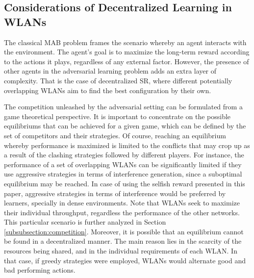 \documentclass[preprint,12pt]{elsarticle}
\begin{document}
\subsection{Considerations of Decentralized Learning in WLANs}
\label{subsection:considerations}
The classical MAB problem frames the scenario whereby an agent interacts with the environment. The agent's goal is to maximize the long-term reward according to the actions it plays, regardless of any external factor. However, the presence of other agents in the adversarial learning problem adds an extra layer of complexity. That is the case of decentralized SR, where different potentially overlapping WLANs aim to find the best configuration by their own. 

The competition unleashed by the adversarial setting can be formulated from a game theoretical perspective. It is important to concentrate on the possible equilibriums that can be achieved for a given game, which can be defined by the set of competitors and their strategies. Of course, reaching an equilibrium whereby performance is maximized is limited to the conflicts that may crop up as a result of the clashing strategies followed by different players. For instance, the performance of a set of overlapping WLANs can be significantly limited if they use aggressive strategies in terms of interference generation, since a suboptimal equilibrium may be reached. In case of using the selfish reward presented in this paper, aggressive strategies in terms of interference would be preferred by learners, specially in dense environments. Note that WLANs seek to maximize their individual throughput, regardless the performance of the other networks. This particular scenario is further analyzed in Section \ref{subsubsection:competition}. Moreover, it is possible that an equilibrium cannot be found in a decentralized manner. The main reason lies in the scarcity of the resources being shared, and in the individual requirements of each WLAN. In that case, if greedy strategies were employed, WLANs would alternate good and bad performing actions. 
	
\end{document}
